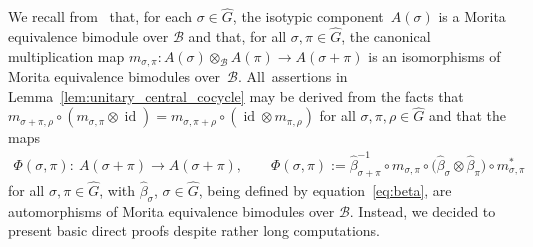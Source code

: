 \documentclass[10pt,a4paper]{amsart}
\numberwithin{equation}{section}
\newcommand*{\tensor}{\otimes}		%
\DeclareMathOperator{\id}{id}		%
\newcommand*{\alg}{\mathcal}		%
\newcommand*{\aB}{\alg{B}} 			%
\begin{document}
\begin{Remark}We recall from~\cite[Corollary~3.11]{SchWa17a} that, for each $\sigma \in \hat G$, the isotypic component~$A(\sigma)$ is a Morita equivalence bimodule over $\aB$ and that, for all $\sigma, \pi \in \hat G$, the canonical multiplication map $m_{\sigma, \pi}\colon A(\sigma) \tensor_\aB A(\pi) \to A(\sigma + \pi)$ is an isomorphisms of Morita equivalence bimodules over~$\aB$.
	All~assertions in Lemma~\ref{lem:unitary_central_cocycle} may be derived from the facts that $m_{\sigma + \pi, \rho} \circ (m_{\sigma, \pi} \tensor \id) = m_{\sigma, \pi + \rho} \circ (\id \tensor m_{\pi, \rho})$ for all $\sigma,\pi,\rho \in \hat G$ and that the maps
	\begin{gather*}
		\Phi(\sigma,\pi)\colon \ A(\sigma + \pi) \to A(\sigma + \pi),
		\qquad
		\Phi(\sigma, \pi) := \hat\beta_{\sigma+ \pi}^{-1} \circ m_{\sigma, \pi} \circ \big(\hat\beta_\sigma \tensor \hat\beta_\pi\big) \circ m_{\sigma, \pi}^*
	\end{gather*}
	for all $\sigma, \pi \in \hat G$, with $\hat \beta_\sigma$, $\sigma \in \hat G$, being defined by equation~\eqref{eq:beta}, are automorphisms of Morita equivalence bimodules over $\aB$.
	Instead, we decided to present basic direct proofs despite rather long computations.
\end{Remark}
\end{document}
